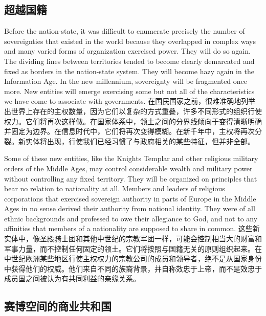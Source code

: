 \begin{Parallel}{97mm}{45mm}
\subsection{超越国籍}

  \ParallelLText
  {Before the nation-state, it was difficult to enumerate precisely the number of sovereignties that existed in the world because they overlapped in complex ways and many varied forms of organization exercised power. They will do so again. The dividing lines between territories tended to become clearly demarcated and fixed as borders in the nation-state system. They will become hazy again in the Information Age. In the new millennium, sovereignty will be fragmented once more. New entities will emerge exercising some but not all of the characteristics we have come to associate with governments. }  
  \ParallelRText
  {\small 在国民国家之前，很难准确地列举出世界上存在的主权数量，因为它们以复杂的方式重叠，许多不同形式的组织行使权力。它们将再次这样做。在国家体系中，领土之间的分界线倾向于变得清晰明确并固定为边界。在信息时代中，它们将再次变得模糊。在新千年中，主权将再次分裂。新实体将出现，行使我们已经习惯了与政府相关的某些特征，但并非全部。}
  \ParallelPar

  \ParallelLText
  {Some of these new entities, like the Knights Templar and other religious military orders of the Middle Ages, may control considerable wealth and military power without controlling any fixed territory. They will be organized on principles that bear no relation to nationality at all. Members and leaders of religious corporations that exercised sovereign authority in parts of Europe in the Middle Ages in no sense derived their authority from national identity. They were of all ethnic backgrounds and professed to owe their allegiance to God, and not to any affinities that members of a nationality are supposed to share in common.}  
  \ParallelRText
  {\small 这些新实体中，像圣殿骑士团和其他中世纪的宗教军团一样，可能会控制相当大的财富和军事力量，而不控制任何固定的领土。它们将按照与国籍无关的原则组织起来。在中世纪欧洲某些地区行使主权权力的宗教公司的成员和领导者，绝不是从国家身份中获得他们的权威。他们来自不同的族裔背景，并自称效忠于上帝，而不是效忠于成员国之间被认为有共同利益的亲缘关系。}
  \ParallelPar

\subsection{赛博空间的商业共和国}


\end{Parallel}
